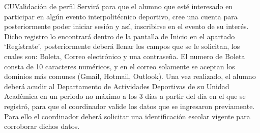 \begin{UseCase}{CU}{Validación de perfil}{
		Servirá para que el alumno que esté interesado en participar en algún evento interpolitécnico deportivo, cree una cuenta para posteriormente poder iniciar sesión y así, inscribirse en el evento de su interés. 
		Dicho registro lo encontrará dentro de la pantalla de Inicio en el apartado ‘Regístrate’, posteriormente deberá llenar los campos que se le solicitan, los cuales son: Boleta, Correo electrónico y una contraseña.
		El numero de Boleta consta de 10 caracteres numéricos, y en el correo solamente se aceptan los dominios más comunes (Gmail, Hotmail, Outlook).
		Una vez realizado, el alumno deberá acudir al Departamento de Actividades Deportivas de su Unidad Académica en un periodo no máximo a los 3 días a partir del día en el que se registró, para que el coordinador valide los datos que se ingresaron previamente. Para ello el coordinador deberá solicitar una identificación escolar vigente para corroborar dichos datos. }
		\label{CU_Validacionperfil}
	
\end{UseCase}
